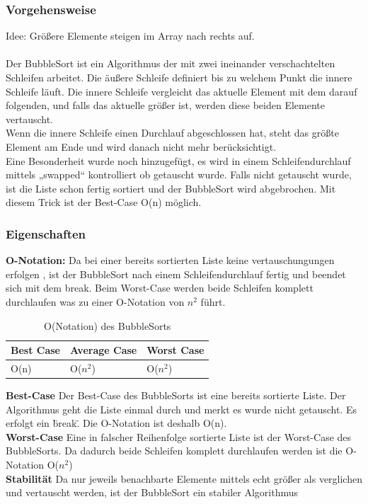 \documentclass{article}
\begin{document}
\subsubsection{Vorgehensweise}
Idee: Größere Elemente steigen im Array nach rechts auf.\\ \\
Der BubbleSort ist ein Algorithmus der mit zwei ineinander verschachtelten Schleifen arbeitet. Die äußere Schleife definiert bis zu welchem Punkt die innere Schleife läuft. Die innere Schleife vergleicht das aktuelle Element mit dem darauf folgenden, und falls das aktuelle größer ist, werden diese beiden Elemente vertauscht.\\
Wenn die innere Schleife einen Durchlauf abgeschlossen hat, steht das größte Element am Ende und wird danach nicht mehr berücksichtigt. \\
Eine Besonderheit wurde noch hinzugefügt, es wird in einem Schleifendurchlauf mittels „swapped“ kontrolliert ob getauscht wurde. Falls nicht getauscht wurde, ist die Liste schon fertig sortiert und der BubbleSort wird abgebrochen. Mit diesem Trick ist der Best-Case O(n) möglich. 


\subsubsection{Eigenschaften}
\textbf{O-Notation:} Da bei einer bereits sortierten Liste keine vertauschungungen erfolgen , ist der BubbleSort nach einem Schleifendurchlauf fertig und beendet sich mit dem break. Beim Worst-Case werden beide Schleifen komplett durchlaufen was zu einer O-Notation von $n^{2}$ führt.
\begin{table}
\centering
\begin{tabular}{lll}
	\hline
	\textbf{Best Case} & \textbf{Average Case} & \textbf{Worst Case} \\
	\hline
	O(n) & O($n^{2}$) & O($n^{2}$) \\
	\hline
\end{tabular}
\caption{O(Notation) des BubbleSorts}
\label{tab:bubbleSort}
\end{table}

\textbf{Best-Case} Der Best-Case des BubbleSorts ist eine bereits sortierte Liste. Der Algorithmus geht die Liste einmal durch und merkt es wurde nicht getauscht. Es erfolgt ein \"break\". Die O-Notation ist deshalb O(n). \\
\textbf{Worst-Case} Eine in falscher Reihenfolge sortierte Liste ist der Worst-Case des BubbleSorts. Da dadurch beide Schleifen komplett durchlaufen werden ist die O-Notation O($n^{2}$) \\
\textbf{Stabilität} Da nur jeweils benachbarte Elemente mittels echt größer als verglichen und vertauscht werden, ist der BubbleSort ein stabiler Algorithmus \\
\end{document}
